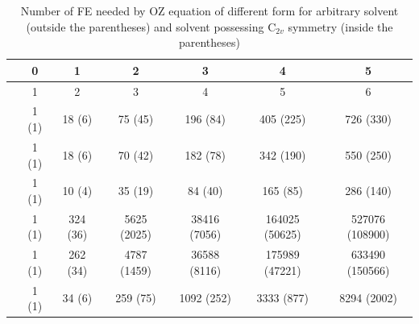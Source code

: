 \begin{table}[t]
\centering{}\hspace{0em} %
\noindent\begin{minipage}[t]{1\columnwidth}%
\begin{center}
\begin{tabular*}{1\textwidth}{@{\extracolsep{\fill}}ccccccc}
\toprule 
\addlinespace[-0.17em]
{\scriptsize{}$m_{\mathrm{max}}$} & {\scriptsize{}0} & {\scriptsize{}1} & {\scriptsize{}2} & {\scriptsize{}3} & {\scriptsize{}4} & {\scriptsize{}5}\tabularnewline
\midrule 
\addlinespace[-0.33em]
{\scriptsize{}$N_{\Theta}$} & {\scriptsize{}1} & {\scriptsize{}2} & {\scriptsize{}3} & {\scriptsize{}4} & {\scriptsize{}5} & {\scriptsize{}6}\tabularnewline
\addlinespace[-0.33em]
{\scriptsize{}$N_{\mathrm{ang}}$ (Gauss-Legendre)} & {\scriptsize{}1 (1)} & {\scriptsize{}18 (6)} & {\scriptsize{}75 (45)} & {\scriptsize{}196 (84)} & {\scriptsize{}405 (225)} & {\scriptsize{}726 (330)}\tabularnewline
\addlinespace[-0.33em]
{\scriptsize{}$N_{\mathrm{ang}}$ (Lebedev$\times\psi$)} & {\scriptsize{}1 (1)} & {\scriptsize{}18 (6)} & {\scriptsize{}70 (42)} & {\scriptsize{}182 (78)} & {\scriptsize{}342 (190)} & {\scriptsize{}550 (250)}\tabularnewline
\addlinespace[-0.33em]
{\scriptsize{}$N_{\mathrm{proj}}$ } & {\scriptsize{}1 (1)} & {\scriptsize{}10 (4)} & {\scriptsize{}35 (19)} & {\scriptsize{}84 (40)} & {\scriptsize{}165 (85)} & {\scriptsize{}286 (140)}\tabularnewline
\addlinespace[-0.33em]
{\scriptsize{}FE for eq. (\ref{eq:gamma-k})} & {\scriptsize{}1 (1)} & {\scriptsize{}324 (36)} & {\scriptsize{}5625 (2025)} & {\scriptsize{}38416 (7056)} & {\scriptsize{}164025 (50625)} & {\scriptsize{}527076 (108900)}\tabularnewline
\addlinespace[-0.33em]
{\scriptsize{}FE for eq. (\ref{eq:im})} & {\scriptsize{}1 (1)} & {\scriptsize{}262 (34)} & {\scriptsize{}4787 (1459)} & {\scriptsize{}36588 (8116)} & {\scriptsize{}175989 (47221)} & {\scriptsize{}633490 (150566)}\tabularnewline
\addlinespace[-0.33em]
{\scriptsize{}FE for eq. (\ref{eq:gamma-blum})} & {\scriptsize{}1 (1)} & {\scriptsize{}34 (6)} & {\scriptsize{}259 (75)} & {\scriptsize{}1092 (252)} & {\scriptsize{}3333 (877)} & {\scriptsize{}8294 (2002)}\tabularnewline
\bottomrule
\end{tabular*}\caption[Number of FE needed by OZ equation of different form]{Number of \acs{FE} needed by \acs{OZ} equation of different form
for arbitrary solvent (outside the parentheses) and solvent possessing
$\mathrm{C}_{2v}$ symmetry (inside the parentheses)\label{tab:FE-of-OZ}}
\par\end{center}%
\end{minipage}
\end{table}


